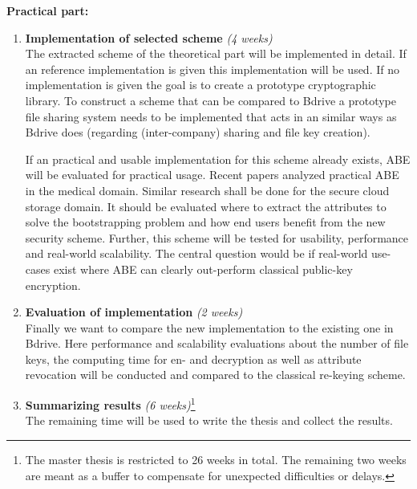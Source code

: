 \documentclass[twocolumn]{article}
\begin{document}
\noindent \textbf{Practical part:}
\begin{enumerate}
	\item\textbf{Implementation of selected scheme} \textit{(4 weeks)}\\
		  The extracted scheme of the theoretical part will be implemented in detail. If an reference implementation is given this implementation will be used. If no implementation is given the goal is to create a prototype cryptographic library. To construct a scheme that can be compared to Bdrive a prototype file sharing system needs to be implemented that acts in an similar ways as Bdrive does (regarding (inter-company) sharing and file key creation). 

		  If an practical and usable implementation for this scheme already exists, ABE will be evaluated for practical usage. Recent papers analyzed practical ABE in the medical domain. \cite{thatmann2016please} \cite{li2013scalable} \cite{akinyele2011securing} Similar research shall be done for the secure cloud storage domain. It should be evaluated where to extract the attributes to solve the bootstrapping problem and how end users benefit from the new security scheme. Further, this scheme will be tested for usability, performance and real-world scalability. The central question would be if real-world use-cases exist where ABE can clearly out-perform classical public-key encryption.

	\item\textbf{Evaluation of implementation} \textit{(2 weeks)}\\
		  Finally we want to compare the new implementation to the existing one in Bdrive. Here performance and scalability evaluations about the number of file keys, the computing time for en- and decryption as well as attribute revocation will be conducted and compared to the classical re-keying scheme.
		  
	\item\textbf{Summarizing results} \textit{(6 weeks)}\footnote{The master thesis is restricted to 26 weeks in total. The remaining two weeks are meant as a buffer to compensate for unexpected difficulties or delays.}\\
		  The remaining time will be used to write the thesis and collect the results.   
\end{enumerate}
\clearpage
\end{document}
